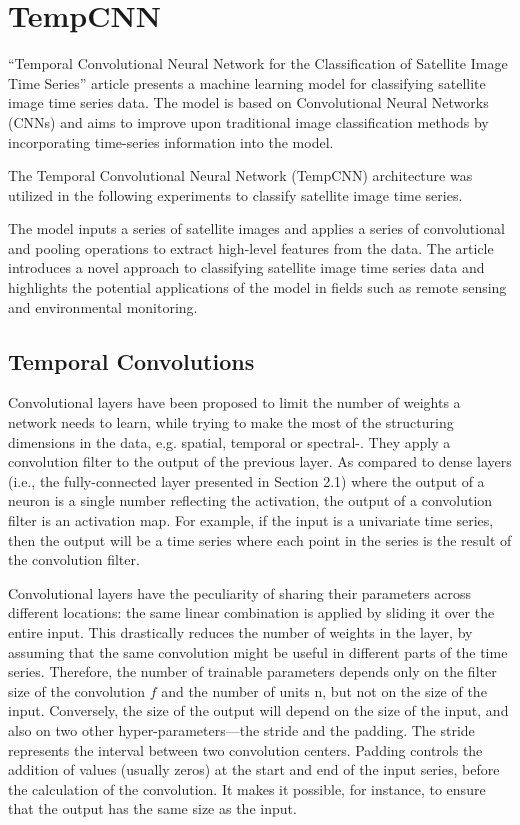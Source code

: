 \section{TempCNN}

``Temporal Convolutional Neural Network for the Classification of Satellite Image Time Series'' article \cite{tempCNN} presents a machine learning model for classifying satellite image time series data.
The model is based on Convolutional Neural Networks (CNNs) and aims to improve upon traditional image classification methods by incorporating time-series information into the model.

The Temporal Convolutional Neural Network (TempCNN) architecture was utilized in the following experiments to classify satellite image time series.


The model inputs a series of satellite images and applies a series of convolutional and pooling operations to extract high-level features from the data.
The article introduces a novel approach to classifying satellite image time series data and highlights the potential applications of the model in fields such as remote sensing and environmental monitoring.

\subsection{Temporal Convolutions}
Convolutional layers have been proposed to limit the number of weights a network needs to learn, while trying to make the most of the structuring dimensions in the data, e.g. spatial, temporal or spectral-\cite{NIPS1989_53c3bce6}.
They apply a convolution filter to the output of the previous layer. As compared to dense layers (i.e., the fully-connected layer presented in Section 2.1) where the output of a neuron is a single number reflecting the activation, the output of a convolution filter is an activation map. 
For example, if the input is a univariate time series, then the output will be a time series where each point in the series is the result of the convolution filter.

Convolutional layers have the peculiarity of sharing their parameters across different locations: the same linear combination is applied by sliding it over the entire input.
This drastically reduces the number of weights in the layer, by assuming that the same convolution might be useful in different parts of the time series.
Therefore, the number of trainable parameters depends only on the filter size of the convolution $f$ and the number of units n, but not on the size of the input.
Conversely, the size of the output will depend on the size of the input, and also on two other hyper-parameters—the stride and the padding.
The stride represents the interval between two convolution centers.
Padding controls the addition of values (usually zeros) at the start and end of the input series, before the calculation of the convolution.
It makes it possible, for instance, to ensure that the output has the same size as the input.

